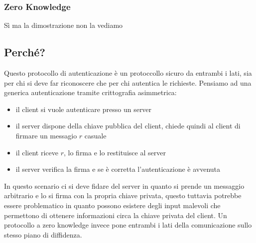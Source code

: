 \subsubsection{Zero Knowledge}
Sì ma la dimostrazione non la vediamo

\subsection{Perché?}
Questo protocollo di autenticazione è un protoccollo sicuro da entrambi i lati, sia per chi si deve far riconoscere che per chi autentica le richieste. Pensiamo ad una generica autenticazione tramite crittografia asimmetrica:
\begin{itemize}
    \item il client si vuole autenticare presso un server
    \item il server dispone della chiave pubblica del client, chiede quindi al client di firmare un messagio $r$ casuale
    \item il client riceve $r$, lo firma e lo restituisce al server
    \item il server verifica la firma e se è corretta l'autenticazione è avvenuta
\end{itemize}
In questo scenario ci si deve fidare del server in quanto si prende un messaggio arbitrario e lo si firma con la propria chiave privata, questo tuttavia potrebbe essere problematico in quanto possono esistere degli input malevoli che permettono di ottenere informazioni circa la chiave privata del client. Un protocollo a zero knowledge invece pone entrambi i lati della comunicazione sullo stesso piano di diffidenza.

\clearpage